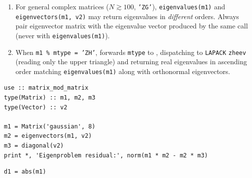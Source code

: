\begin{notebox}
\begin{enumerate}
  \item For general complex matrices ($N \gtrsim 100$, \texttt{'ZG'}), \texttt{eigenvalues(m1)} and \texttt{eigenvectors(m1, v2)} may return eigenvalues in \emph{different} orders. Always pair eigenvector matrix  with the eigenvalue vector  produced by the same  call (never with \texttt{eigenvalues(m1)}).
  \item When \texttt{m1 \% mtype = 'ZH'},  forwards \texttt{mtype} to , dispatching to \texttt{LAPACK} \texttt{zheev} (reading only the upper triangle) and returning real eigenvalues in ascending order matching \texttt{eigenvalues(m1)} along with orthonormal eigenvectors.
\end{enumerate}
\end{notebox}

\begin{description}[leftmargin=2.2cm, style=nextline]
\end{description}

\lstset{language=[95]Fortran}
\begin{lstlisting}
use :: matrix_mod_matrix
type(Matrix) :: m1, m2, m3
type(Vector) :: v2

m1 = Matrix('gaussian', 8)
m2 = eigenvectors(m1, v2)
m3 = diagonal(v2)
print *, 'Eigenproblem residual:', norm(m1 * m2 - m2 * m3)
\end{lstlisting}



\lstset{language=[95]Fortran}
\begin{lstlisting}
d1 = abs(m1)
\end{lstlisting}

